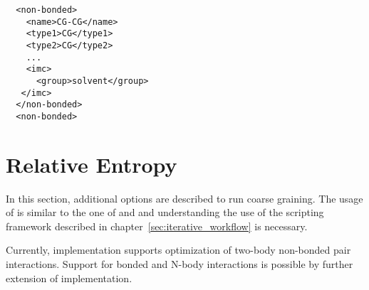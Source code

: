 \begin{lstlisting}
  <non-bonded>
    <name>CG-CG</name>
    <type1>CG</type1>
    <type2>CG</type2>
    ...
    <imc>
      <group>solvent</group>
   </imc>
  </non-bonded>
  <non-bonded>
\end{lstlisting}


\section{Relative Entropy}
\label{sec:iterative_methods_re}
In this section, additional options are described to run \re coarse
graining. The usage of \re is similar to the one of \ibi and \imc and
understanding the use of the scripting framework described in
chapter~\ref{sec:iterative_workflow} is necessary.

Currently, \re implementation supports optimization of two-body
non-bonded pair interactions. Support for bonded and N-body interactions is
possible by further extension of \re implementation.

